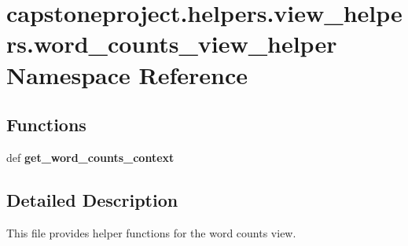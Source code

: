 \hypertarget{namespacecapstoneproject_1_1helpers_1_1view__helpers_1_1word__counts__view__helper}{}\section{capstoneproject.\+helpers.\+view\+\_\+helpers.\+word\+\_\+counts\+\_\+view\+\_\+helper Namespace Reference}
\label{namespacecapstoneproject_1_1helpers_1_1view__helpers_1_1word__counts__view__helper}
\subsection*{Functions}
\begin{DoxyCompactItemize}
\item 
\mbox{\label{namespacecapstoneproject_1_1helpers_1_1view__helpers_1_1word__counts__view__helper_a27e6e456db746057b2a4945acf760c6b}} 
def {\bfseries get\+\_\+word\+\_\+counts\+\_\+context}
\end{DoxyCompactItemize}


\subsection{Detailed Description}
\begin{DoxyVerb}This file provides helper functions for the word counts view.
\end{DoxyVerb}
 